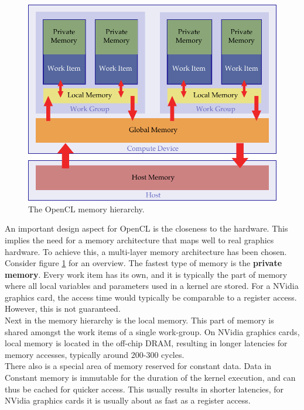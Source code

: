 \begin{figure}
	\begin{center}
		\includegraphics[width=0.75\linewidth]{images/memory_hierarchy}
	\end{center}
	\caption{The OpenCL memory hierarchy.}
	\label{fig:theory_memory_hierarchy}
\end{figure}

An important design aspect for OpenCL is the closeness to the hardware. This implies the need for a memory architecture that maps well to real graphics hardware. To achieve this, a multi-layer memory architecture has been chosen. Consider figure \ref{fig:theory_memory_hierarchy} for an overview. The fastest type of memory is the \textbf{private memory}. Every work item has its own, and it is typically the part of memory where all local variables and parameters used in a kernel are stored. For a NVidia graphics card, the access time would typically be comparable to a register access. However, this is not guaranteed. \cite{tompson2012introduction,nvidia2009opencl} \\

Next in the memory hierarchy is the local memory. This part of memory is shared amongst the work items of a single work-group. On NVidia graphics cards, local memory is located in the off-chip DRAM, resulting in longer latencies for memory accesses, typically around 200-300 cycles. \cite{nvidia2009opencl,hwu2009compute} \\

There also is a special area of memory reserved for constant data. Data in Constant memory is immutable for the duration of the kernel execution, and can thus be cached for quicker access. This usually results in shorter latencies, for NVidia graphics cards it is usually about as fast as a register access. \cite{hwu2009compute} \\


